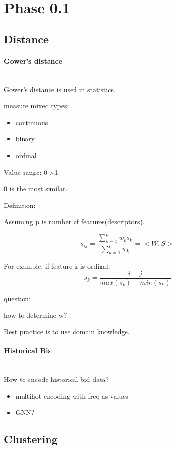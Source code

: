 \documentclass[runningheads]{llncs}
\begin{document}
\section{Phase 0.1}

\subsection{Distance}
\paragraph{Gower's distance}~\\

Gower's distance is used in statistics.

measure mixed types:
\begin{itemize}
    \item continuous
    \item binary
    \item ordinal
\end{itemize}

Value range: 0->1.

0 is the most similar. 

Definition:

Assuming p is number of features(descriptors).

\begin{equation}
    s_{ij} = \frac{\sum_{k=1}^p w_k s_k}{\sum_{k=1}^p w_k} = <W, S>
\end{equation}

For example, if feature k is ordinal:
\begin{equation}
    s_k = \frac{i - j}{max(s_k)- min(s_k)}
\end{equation}

question:

how to determine w?

Best practice is to use domain knowledge.

\paragraph{Historical Bis}~\\
How to encode historical bid data?
\begin{itemize}
    \item multihot encoding with freq as values
    \item GNN?
\end{itemize}

\subsection{Clustering}
\end{document}
